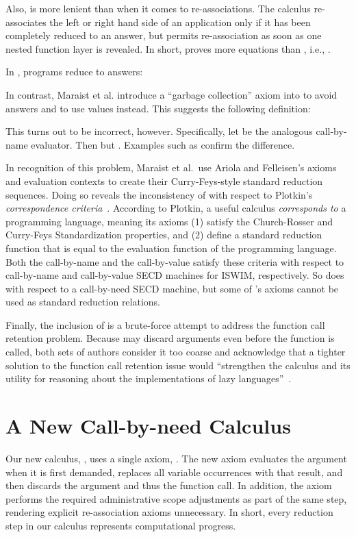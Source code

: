 \documentclass[runningheads,a4paper]{llncs}
\begin{document}
Also, \lmow is more lenient than \laf when it comes to
 re-associations. The \laf calculus re-associates the left or right
 hand side of an application only if it has been completely reduced to an answer,
 but \lmow permits re-association as soon as one nested function layer is
 revealed. In short, \lmow proves more equations than \laf, i.e.,
 .

In \laf, programs reduce to answers:
  
 In contrast, Maraist et al. introduce a ``garbage collection'' axiom into 
 \lmow to avoid answers and to use values instead. This suggests the
 following definition: 
  
 This turns out to be incorrect, however. Specifically, let  be
 the analogous call-by-name evaluator. Then  but
 . Examples such as  confirm
 the difference.

In recognition of this problem, Maraist et al.\ use Ariola and Felleisen's
 axioms and evaluation contexts to create their Curry-Feys-style standard
 reduction sequences. Doing so reveals the inconsistency of \lmow with 
 respect to Plotkin's \emph{correspondence criteria}~\cite{Plotkin1975LC}. 
 According to Plotkin, a useful calculus \emph{corresponds to} a
 programming language, meaning its axioms (1) satisfy the 
 Church-Rosser and Curry-Feys Standardization properties, and (2) define a 
 standard reduction function that is equal to
 the evaluation function of the programming language. Both the call-by-name and
 the call-by-value \lcs satisfy these criteria with respect to call-by-name and
 call-by-value SECD machines for ISWIM, respectively. So does \laf with respect
 to a call-by-need SECD machine, but some of \lmow's axioms
 cannot be used as standard reduction relations.

Finally, the inclusion of \Gnr is a brute-force attempt to address the
 function call retention problem. Because \Gnr may discard arguments even before
 the function is called, both sets of authors consider it too coarse and
 acknowledge that a tighter solution to the function call retention issue would
 ``strengthen the calculus and its utility for reasoning about the
 implementations of lazy languages''~\cite{Ariola1995Cbneed}.

\section{A New Call-by-need  Calculus}

Our new calculus, \lneed, uses a single axiom, \betaneednr. The new axiom evaluates the argument when it
 is first demanded, replaces all variable occurrences with that result, and
 then discards the argument and thus the function call. In addition, the
 axiom performs the required administrative scope adjustments as part of
 the same step, rendering explicit re-association axioms unnecessary. In short,
 every reduction step in our calculus represents computational progress.
\end{document}
